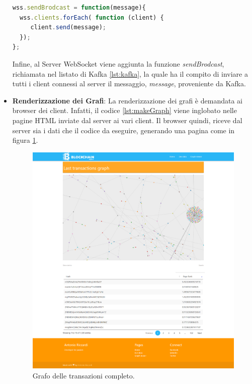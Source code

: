 \begin{itemize}
\begin{lstlisting}[language=Javascript, label=lst:websocket, caption={Creazione di un Server WebSocket.}]
wss.sendBrodcast = function(message){
  wss.clients.forEach( function (client) {
     client.send(message);
  });
};
\end{lstlisting}

Infine, al Server WebSocket viene aggiunta la funzione \textit{sendBrodcast}, richiamata nel listato di Kafka \ref{lst:kafka}, la quale ha il compito di inviare a tutti i client connessi al server il messaggio, \textit{message}, proveniente da Kafka.

\item \textbf{Renderizzazione dei Grafi}: La renderizzazione dei grafi è demandata ai browser dei client. Infatti, il codice \ref{lst:makeGraph} viene inglobato nelle pagine HTML inviate dal server ai vari client. Il browser quindi, riceve dal server sia i dati che il codice da eseguire, generando una pagina come in figura \ref{fig:graphView}.

\begin{figure}[H]
	\centering
	\includegraphics[width=\textwidth, height=0.65\textheight]{images/graphView.png}
	\caption{Grafo delle transazioni completo.}
	\label{fig:graphView}
\end{figure}

\begin{lstlisting}[language=Javascript, label=lst:makeGraph, caption={Funzione per grafi.}]


\end{lstlisting}
\end{itemize}
